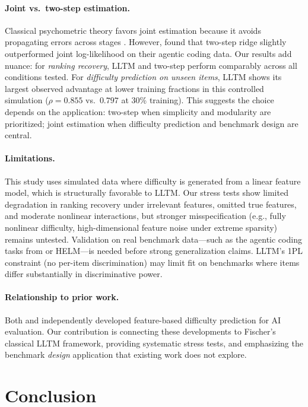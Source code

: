 \documentclass[11pt,a4paper]{article}
\begin{document}
\paragraph{Joint vs.\ two-step estimation.}
Classical psychometric theory favors joint estimation because it avoids
propagating errors across stages \citep{deboeck2004}. However,
\citet{ge2026agent} found that two-step ridge slightly outperformed
joint log-likelihood on their agentic coding data. Our results add
nuance: for \emph{ranking recovery}, LLTM and two-step perform
comparably across all conditions tested. For \emph{difficulty
prediction on unseen items}, LLTM shows its largest observed advantage
at lower training fractions in this controlled simulation ($\rho = 0.855$
vs.\ $0.797$ at 30\% training). This suggests the choice depends on the
application: two-step when simplicity and modularity are prioritized;
joint estimation when difficulty prediction and benchmark design are
central.

\paragraph{Limitations.}
This study uses simulated data where difficulty is generated from a
linear feature model, which is structurally favorable to LLTM. Our
stress tests show limited degradation in ranking recovery under
irrelevant features, omitted
true features, and moderate nonlinear interactions, but stronger
misspecification (e.g., fully nonlinear difficulty, high-dimensional
feature noise under extreme sparsity) remains untested. Validation
on real benchmark data---such as the agentic coding tasks from
\citet{ge2026agent} or HELM---is needed before strong generalization
claims. LLTM's 1PL constraint (no per-item discrimination) may limit
fit on benchmarks where items differ substantially in discriminative
power.

\paragraph{Relationship to prior work.}
Both \citet{truong2025reliable} and \citet{ge2026agent} independently
developed feature-based difficulty prediction for AI evaluation. Our
contribution is connecting these developments to Fischer's classical
LLTM framework, providing systematic stress tests, and emphasizing the
benchmark \emph{design} application that existing work does not explore.


\section{Conclusion}
\label{sec:conclusion}
\end{document}
